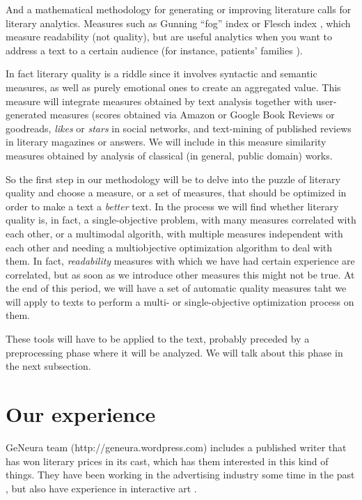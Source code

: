 \documentclass[a4paper,12pt,twocolumn]{article}
\begin{document}
And a mathematical methodology for generating or improving literature
calls for literary analytics. Measures such as Gunning ``fog'' index
\cite{gunning1969fog} or Flesch index \cite{roberts1994effects}, which
measure readability (not quality), but are useful analytics when you
want to address a text to a certain audience (for instance, patients'
families \cite{grossman1994informed}). 

In fact literary quality is a riddle since it involves syntactic and
semantic measures, as well as purely emotional ones to create an aggregated value. This
  measure will integrate measures obtained by text analysis together
  with user-generated measures (scores obtained via Amazon or Google
  Book Reviews or goodreads, {\em likes} or {\em stars} in social
  networks, and text-mining of published reviews in literary magazines
  or answers. We will include in this measure similarity measures
  obtained by analysis of classical (in general, public domain)
  works. 

So the first step in our methodology will be to delve into the puzzle
of literary quality and choose a measure, or a set of measures, that
should be optimized in order to make a text a {\em better} text. In
the process we will find whether literary quality is, in fact, a
single-objective problem, with many measures correlated with each
other, or a multimodal algorith, with multiple measures independent
with each other and needing a multiobjective optimization algorithm to
deal with them. In fact, {\em readability} measures with which we have
had certain experience are correlated, but as soon as we introduce
other measures this might not be true. At the end of this period, we
will have a set of automatic quality measures taht we will apply to
texts to perform a multi- or single-objective optimization process on
them. 

These tools will have to be applied to the text, probably preceded by
a preprocessing phase where it will be analyzed. We will talk about
this phase in the next subsection.



\section{Our experience}
\label{sec:exp}

GeNeura team (http://geneura.wordpress.com) includes a published
writer that has won literary prices in its cast, which has them
interested in this kind of things. They have been working in the
advertising industry some time in the past
\cite{merelo:ecal97,AISB97}, but also have experience in interactive
art \cite{DBLP:conf/cec/TrujilloVVG13,DBLP:conf/cec/FernandesIBRG11}.
\end{document}
